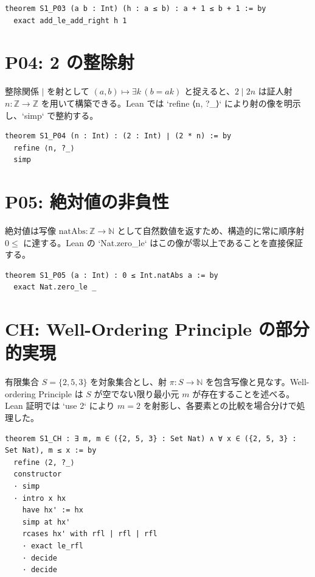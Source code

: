 \documentclass[a4paper]{ltjsarticle}
\begin{document}
\begin{lstlisting}[caption={Lean 証明: S1\_P03},label={lst:P03}]
theorem S1_P03 (a b : Int) (h : a ≤ b) : a + 1 ≤ b + 1 := by
  exact add_le_add_right h 1
\end{lstlisting}

\section{P04: 2 の整除射}
整除関係 $\mid$ を射として $(a,b) \mapsto \exists k\, (b = ak)$ と捉えると、$2 \mid 2n$ は証人射 $n : \mathbb{Z} \to \mathbb{Z}$ を用いて構築できる。Lean では `refine ⟨n, ?_⟩` により射の像を明示し、`simp` で整約する。

\begin{lstlisting}[caption={Lean 証明: S1\_P04},label={lst:P04}]
theorem S1_P04 (n : Int) : (2 : Int) ∣ (2 * n) := by
  refine ⟨n, ?_⟩
  simp
\end{lstlisting}

\section{P05: 絶対値の非負性}
絶対値は写像 $\mathrm{natAbs} : \mathbb{Z} \to \mathbb{N}$ として自然数値を返すため、構造的に常に順序射 $0 \leqslant$ に達する。Lean の `Nat.zero_le` はこの像が零以上であることを直接保証する。

\begin{lstlisting}[caption={Lean 証明: S1\_P05},label={lst:P05}]
theorem S1_P05 (a : Int) : 0 ≤ Int.natAbs a := by
  exact Nat.zero_le _
\end{lstlisting}

\section{CH: Well-Ordering Principle の部分的実現}
有限集合 $S = \{2,5,3\}$ を対象集合とし、射 $\pi : S \to \mathbb{N}$ を包含写像と見なす。Well-ordering Principle は $S$ が空でない限り最小元 $m$ が存在することを述べる。Lean 証明では `use 2` により $m = 2$ を射影し、各要素との比較を場合分けで処理した。

\begin{lstlisting}[caption={Lean 証明: S1\_CH},label={lst:CH}]
theorem S1_CH : ∃ m, m ∈ ({2, 5, 3} : Set Nat) ∧ ∀ x ∈ ({2, 5, 3} : Set Nat), m ≤ x := by
  refine ⟨2, ?_⟩
  constructor
  · simp
  · intro x hx
    have hx' := hx
    simp at hx'
    rcases hx' with rfl | rfl | rfl
    · exact le_rfl
    · decide
    · decide
\end{lstlisting}
\end{document}
